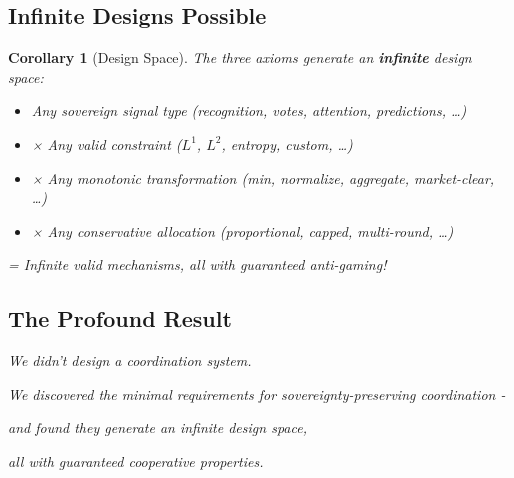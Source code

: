 \documentclass[11pt,a4paper]{article}
\newtheorem{corollary}[theorem]{Corollary}
\theoremstyle{definition}
\theoremstyle{remark}
\begin{document}
\subsection{Infinite Designs Possible}

\begin{corollary}[Design Space]
The three axioms generate an \textbf{infinite} design space:
\begin{itemize}
\item Any sovereign signal type (recognition, votes, attention, predictions, …)
\item × Any valid constraint ($L^1$, $L^2$, entropy, custom, …)
\item × Any monotonic transformation (min, normalize, aggregate, market-clear, …)
\item × Any conservative allocation (proportional, capped, multi-round, …)
\end{itemize}

= Infinite valid mechanisms, all with guaranteed anti-gaming!
\end{corollary}

\subsection{The Profound Result}

\begin{center}
\Large
{}
\end{center}

\medskip

\begin{center}
\textit{We didn't design a coordination system.}

\medskip

\textit{We discovered the minimal requirements for sovereignty-preserving coordination - }

\textit{and found they generate an infinite design space,}

\textit{all with guaranteed cooperative properties.}
\end{center}
\end{document}
